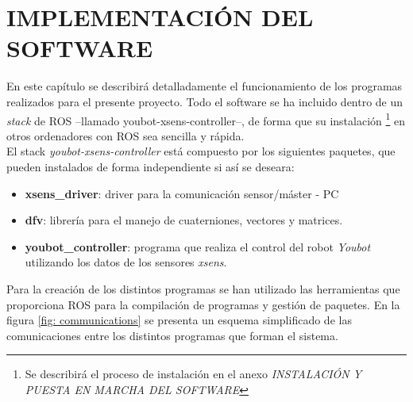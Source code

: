 \documentclass[12pt, a4paper]{report}
\begin{document}
\chapter{IMPLEMENTACIÓN DEL SOFTWARE}

En este capítulo se describirá detalladamente el funcionamiento de los programas realizados para el presente proyecto. Todo el software se ha incluido dentro de un \textit{stack} de ROS --llamado youbot-xsens-controller--, de forma que su instalación \footnote{Se describirá el proceso de instalación en el anexo \textit{INSTALACIÓN Y PUESTA EN MARCHA DEL SOFTWARE}} en otros ordenadores con ROS sea sencilla y rápida.\\

El stack \textit{youbot-xsens-controller} está compuesto por los siguientes paquetes, que pueden instalados de forma independiente si así se deseara:

\begin{itemize}

\item \textbf{xsens\_driver}: driver para la comunicación sensor/máster - PC

\item \textbf{dfv}: librería para el manejo de cuaterniones, vectores y matrices.

\item \textbf{youbot\_controller}: programa que realiza el control del robot \textit{Youbot} utilizando los datos de los sensores \textit{xsens}.

\end{itemize}

Para la creación de los distintos programas se han utilizado las herramientas que proporciona ROS para la compilación de programas y gestión de paquetes. En la figura \ref{fig: communications} se presenta un esquema simplificado de las comunicaciones entre los distintos programas que forman el sistema.
\end{document}
